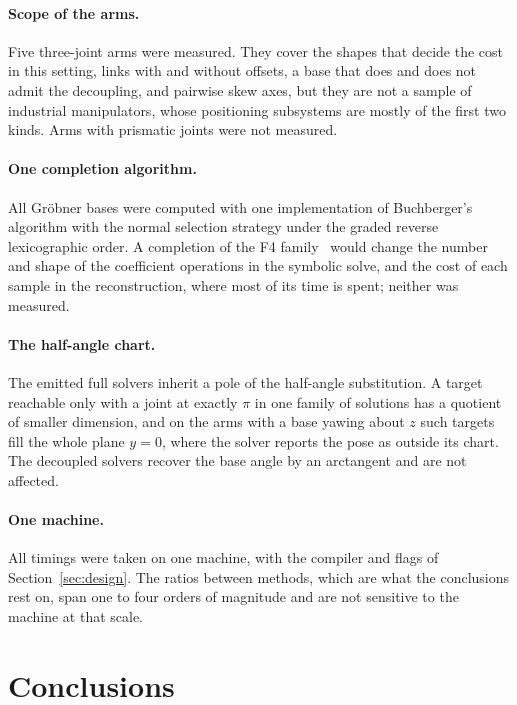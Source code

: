 \documentclass[11pt,a4paper]{article}
\theoremstyle{plain}
\theoremstyle{definition}
\theoremstyle{remark}
\begin{document}
\paragraph{Scope of the arms.} Five three-joint arms were measured. They cover the shapes that decide
the cost in this setting, links with and without offsets, a base that does and does not admit the
decoupling, and pairwise skew axes, but they are not a sample of industrial manipulators, whose
positioning subsystems are mostly of the first two kinds. Arms with prismatic joints were not
measured.

\paragraph{One completion algorithm.} All Gr\"obner bases were computed with one implementation of
Buchberger's algorithm with the normal selection strategy under the graded reverse lexicographic
order. A completion of the F4 family~\cite{faugere1999} would change the number and shape of the
coefficient operations in the symbolic solve, and the cost of each sample in the reconstruction,
where most of its time is spent; neither was measured.

\paragraph{The half-angle chart.} The emitted full solvers inherit a pole of the half-angle
substitution. A target reachable only with a joint at exactly $\pi$ in one family of solutions has a
quotient of smaller dimension, and on the arms with a base yawing about $z$ such targets fill the whole
plane $y = 0$, where the solver reports the pose as outside its chart. The decoupled solvers recover the
base angle by an arctangent and are not affected.

\paragraph{One machine.} All timings were taken on one machine, with the compiler and flags of
Section~\ref{sec:design}. The ratios between methods, which are what the conclusions rest on, span
one to four orders of magnitude and are not sensitive to the machine at that scale.

\section{Conclusions}
\label{sec:conclusions}
\end{document}
